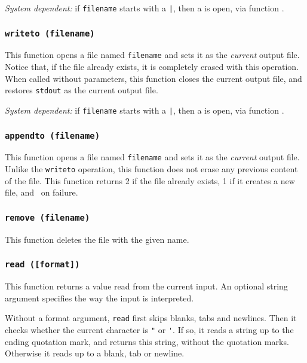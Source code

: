 {\em System dependent:} if \verb'filename' starts with a \verb'|',
then a  is open, via function .

\subsubsection*{{\tt writeto (filename)}}

This function opens a file named \verb'filename' and sets it as the
{\em current} output file.
Notice that, if the file already exists, it is completely erased with this
operation.
When called without parameters,
this function closes the current output file,
and restores \verb'stdout' as the current output file.

{\em System dependent:} if \verb'filename' starts with a \verb'|',
then a  is open, via function .

\subsubsection*{{\tt appendto (filename)}}

This function opens a file named \verb'filename' and sets it as the
{\em current} output file.
Unlike the \verb'writeto' operation,
this function does not erase any previous content of the file.
This function returns 2 if the file already exists,
1 if it creates a new file, and \nil\ on failure.

\subsubsection*{{\tt remove (filename)}}

This function deletes the file with the given name.

\subsubsection*{{\tt read ([format])}}

This function returns a value read from the current input.
An optional string argument specifies the way the input is interpreted.

Without a format argument, {\tt read} first skips blanks, tabs and newlines.
Then it checks whether the current character is \verb'"' or \verb-'-.
If so, it reads a string up to the ending quotation mark,
and returns this string, without the quotation marks.
Otherwise it reads up to a blank, tab or newline.


